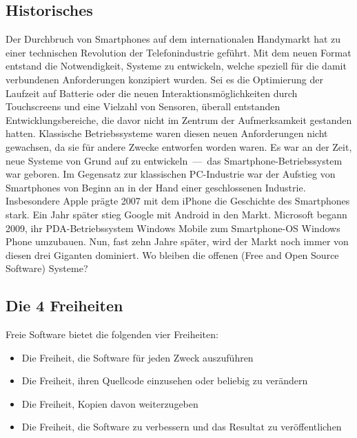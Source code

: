 \subsection{Historisches}
Der Durchbruch von Smartphones auf dem internationalen Handymarkt hat zu einer technischen Revolution der Telefonindustrie geführt. Mit dem neuen Format entstand die Notwendigkeit, Systeme zu entwickeln, welche speziell für die damit verbundenen Anforderungen konzipiert wurden. Sei es die Optimierung der Laufzeit auf Batterie oder die neuen Interaktionsmöglichkeiten durch Touchscreens und eine Vielzahl von Sensoren, überall entstanden Entwicklungsbereiche, die davor nicht im Zentrum der Aufmerksamkeit gestanden hatten. Klassische Betriebssysteme waren diesen neuen Anforderungen nicht gewachsen, da sie für andere Zwecke entworfen worden waren. Es war an der Zeit, neue Systeme von Grund auf zu \mbox{entwickeln --- das} \mbox{Smartphone-Betriebssystem} war geboren.
Im Gegensatz zur klassischen \mbox{PC-Industrie} war der Aufstieg von Smartphones von Beginn an in der Hand einer geschlossenen Industrie. Insbesondere Apple prägte 2007 mit dem iPhone die Geschichte des Smartphones stark. Ein Jahr später stieg Google mit Android in den Markt. Microsoft begann 2009, ihr \mbox{PDA-Betriebssystem} Windows Mobile zum \mbox{Smartphone-OS} Windows Phone umzubauen. Nun, fast zehn Jahre später, wird der Markt noch immer von diesen drei Giganten dominiert. Wo bleiben die offenen (Free and Open Source Software) Systeme?
\newline

\subsection{Die 4 Freiheiten}
Freie Software bietet die folgenden vier Freiheiten\thinspace\cite{online:fsf_vier-freiheiten}:
\begin{itemize}
	\renewcommand\labelitemi{--}
	\item Die Freiheit, die Software für jeden Zweck auszuführen
	\item  Die Freiheit, ihren Quellcode einzusehen oder beliebig zu verändern
	\item Die Freiheit, Kopien davon weiterzugeben
	\item Die Freiheit, die Software zu verbessern und das Resultat zu veröffentlichen
\end{itemize}
\mbox{}

